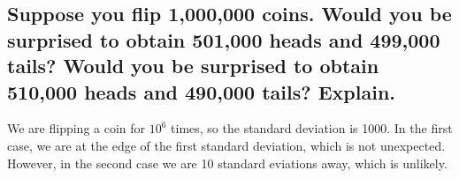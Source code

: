\documentclass[answers]{exam}
\begin{document}
\begin{questions}
\begin{parts}
	\part{Suppose you flip 1,000,000 coins. Would you be surprised to obtain 501,000 heads and 499,000 tails? Would you be surprised to obtain 510,000 heads and 490,000 tails? Explain.}

	\begin{solution}
		We are flipping a coin for $10^6$ times, so the standard deviation is 1000. In the first case, we are at the edge of the first standard deviation, which is not unexpected. However, in the second case we are 10 standard eviations away, which is unlikely.
	\end{solution}
\end{parts}



\end{questions}
\end{document}
